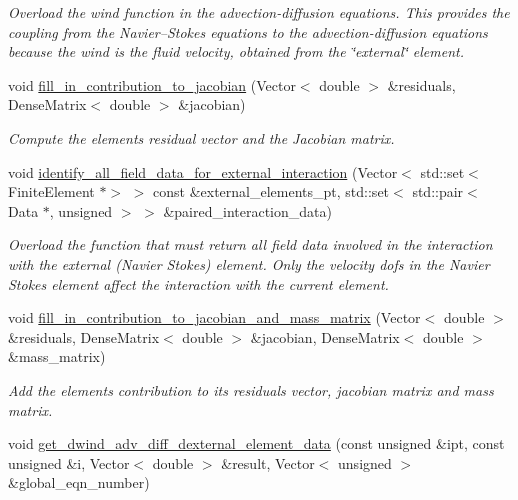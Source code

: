\begin{DoxyCompactItemize}
\begin{DoxyCompactList}\small\item\em Overload the wind function in the advection-\/diffusion equations. This provides the coupling from the Navier--Stokes equations to the advection-\/diffusion equations because the wind is the fluid velocity, obtained from the \char`\"{}external\char`\"{} element. \end{DoxyCompactList}\item 
void \hyperlink{classoomph_1_1RefineableAdvectionDiffusionBoussinesqElement_a89bbdff66fd1fe24f4ae1d681a88d583}{fill\+\_\+in\+\_\+contribution\+\_\+to\+\_\+jacobian} (Vector$<$ double $>$ \&residuals, Dense\+Matrix$<$ double $>$ \&jacobian)
\begin{DoxyCompactList}\small\item\em Compute the element\textquotesingle{}s residual vector and the Jacobian matrix. \end{DoxyCompactList}\item 
void \hyperlink{classoomph_1_1RefineableAdvectionDiffusionBoussinesqElement_abb212175a68a9686ead329ba9fa330f6}{identify\+\_\+all\+\_\+field\+\_\+data\+\_\+for\+\_\+external\+\_\+interaction} (Vector$<$ std\+::set$<$ Finite\+Element $\ast$$>$ $>$ const \&external\+\_\+elements\+\_\+pt, std\+::set$<$ std\+::pair$<$ Data $\ast$, unsigned $>$ $>$ \&paired\+\_\+interaction\+\_\+data)
\begin{DoxyCompactList}\small\item\em Overload the function that must return all field data involved in the interaction with the external (Navier Stokes) element. Only the velocity dofs in the Navier Stokes element affect the interaction with the current element. \end{DoxyCompactList}\item 
void \hyperlink{classoomph_1_1RefineableAdvectionDiffusionBoussinesqElement_a25627bf0853bda6c520a2b1c2c602af4}{fill\+\_\+in\+\_\+contribution\+\_\+to\+\_\+jacobian\+\_\+and\+\_\+mass\+\_\+matrix} (Vector$<$ double $>$ \&residuals, Dense\+Matrix$<$ double $>$ \&jacobian, Dense\+Matrix$<$ double $>$ \&mass\+\_\+matrix)
\begin{DoxyCompactList}\small\item\em Add the element\textquotesingle{}s contribution to its residuals vector, jacobian matrix and mass matrix. \end{DoxyCompactList}\item 
void \hyperlink{classoomph_1_1RefineableAdvectionDiffusionBoussinesqElement_a560911c835c054a25b5e5d8390cc422c}{get\+\_\+dwind\+\_\+adv\+\_\+diff\+\_\+dexternal\+\_\+element\+\_\+data} (const unsigned \&ipt, const unsigned \&i, Vector$<$ double $>$ \&result, Vector$<$ unsigned $>$ \&global\+\_\+eqn\+\_\+number)
$$
\end{DoxyCompactItemize}
